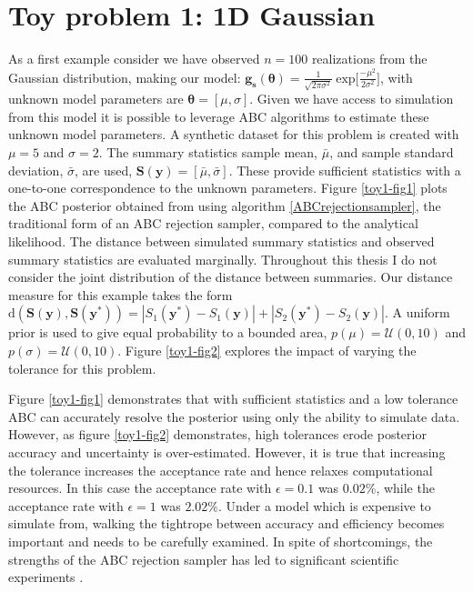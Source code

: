 \section{Toy problem 1: 1D Gaussian}
As a first example consider we have observed $n = 100$ realizations from the Gaussian distribution, making our model: $\bm{g_s}(\bm{\theta}) = \frac{1}{\sqrt{2\pi\sigma^2}}\ \text{exp}\Big[\frac{-\mu^2}{2\sigma^2}\Big]$, with unknown model parameters are $\bm{\theta} = [\mu,\sigma]$. Given we have access to simulation from this model it is possible to leverage ABC algorithms to estimate these unknown model parameters. A synthetic dataset for this problem is created with $\mu = 5$ and $\sigma = 2$. The summary statistics sample mean, $\bar{\mu}$, and sample standard deviation, $\bar{\sigma}$, are used, $\bm{S}(\bm{y}) = [\bar{\mu},\bar{\sigma}]$. These provide sufficient statistics with a one-to-one correspondence to the unknown parameters. Figure \ref{toy1-fig1} plots the ABC posterior obtained from using algorithm \ref{ABCrejectionsampler}, the traditional form of an ABC rejection sampler, compared to the analytical likelihood. The distance between simulated summary statistics and observed summary statistics are evaluated marginally. Throughout this thesis I do not consider the joint distribution of the distance between summaries. Our distance measure for this example takes the form $\text{d}(\bm{S}(\bm{y}),\bm{S}(\bm{y^*})) = |S_1(\bm{y^*}) - S_1(\bm{y})| +| S_2(\bm{y^*}) - S_2(\bm{y})|$. A uniform prior is used to give equal probability to a bounded area, $p(\mu) = \mathcal{U}(0,10)$ and $p(\sigma) = \mathcal{U}(0,10)$. Figure \ref{toy1-fig2} explores the impact of varying the tolerance for this problem.\par

Figure \ref{toy1-fig1} demonstrates that with sufficient statistics and a low tolerance ABC can accurately resolve the posterior using only the ability to simulate data. However, as figure \ref{toy1-fig2} demonstrates, high tolerances erode posterior accuracy and uncertainty is over-estimated. However, it is true that increasing the tolerance increases the acceptance rate and hence relaxes computational resources. In this case the acceptance rate with $\epsilon = 0.1$ was $0.02\%$, while the acceptance rate with $\epsilon = 1$ was $2.02\%$. Under a model which is expensive to simulate from, walking the tightrope between accuracy and efficiency becomes important and needs to be carefully examined. In spite of shortcomings, the strengths of the ABC rejection sampler has led to significant scientific experiments \citep{Fu1997,Weiss1998a,Pritchard1999a}.

